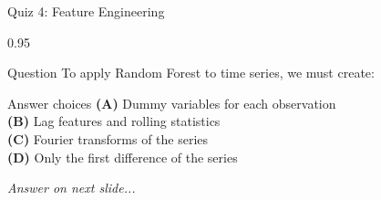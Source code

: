 \documentclass[9pt, aspectratio=169, t]{beamer}
\begin{document}
\begin{frame}{Quiz 4: Feature Engineering}
    \begin{cminipage}{0.95\textwidth}
    \begin{alertblock}{Question}
        To apply Random Forest to time series, we must create:
    \end{alertblock}

    \vspace{0.4cm}

    \begin{block}{Answer choices}
        \textcolor{MainBlue}{\textbf{(A)}} Dummy variables for each observation\\[3pt]
        \textcolor{MainBlue}{\textbf{(B)}} Lag features and rolling statistics\\[3pt]
        \textcolor{MainBlue}{\textbf{(C)}} Fourier transforms of the series\\[3pt]
        \textcolor{MainBlue}{\textbf{(D)}} Only the first difference of the series
    \end{block}

    \vspace{0.5cm}

    \begin{center}
        \textit{Answer on next slide...}
    \end{center}
    \end{cminipage}
\end{frame}
\end{document}
